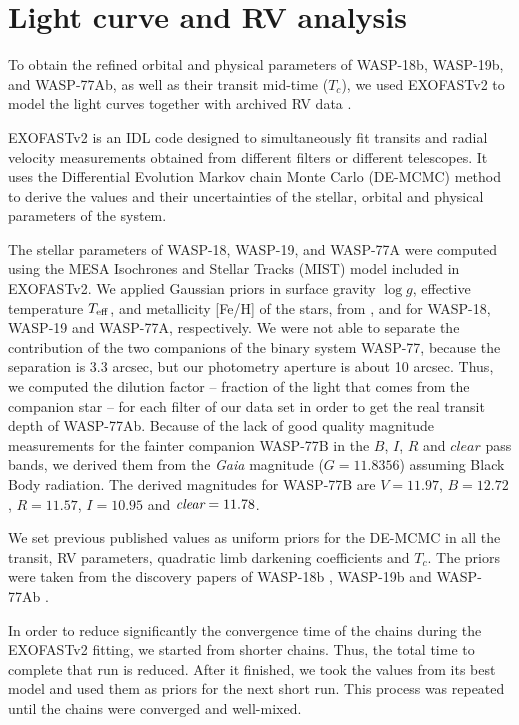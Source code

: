 \section{Light curve and RV analysis}\label{lc}

To obtain the refined orbital and physical parameters of WASP-18b, WASP-19b, and WASP-77Ab, as well as their transit mid-time ($T_{c}$), we used EXOFASTv2 \citep{Eastman2013,Eastman2017} to model the light curves together with archived RV data \cite{Hellier2009, Hebb2010, Maxted2013}.

EXOFASTv2 is an IDL code designed to simultaneously fit transits and radial velocity measurements obtained from different filters or different telescopes. It uses the Differential Evolution Markov chain Monte Carlo (DE-MCMC) method to derive the values and their uncertainties of the stellar, orbital and physical parameters of the system. 

The stellar parameters of WASP-18, WASP-19, and WASP-77A were computed using the MESA Isochrones and Stellar Tracks (MIST) model \citep{Dotter2016} included in EXOFASTv2. We applied Gaussian priors in surface gravity $\log{g}$, effective temperature $T_{\rm eff}$, and metallicity [Fe/H] of the stars, from \cite{Hellier2009},\cite{Hebb2010} and \cite{Maxted2013} for WASP-18, WASP-19 and WASP-77A, respectively. 
We were not able to separate the contribution of the two companions of the binary system WASP-77, because the separation is 3.3 arcsec, but our photometry aperture is about 10 arcsec. Thus, we computed the dilution factor -- fraction of the light that comes from the companion star -- for each filter of our data set in order to get the real transit depth of WASP-77Ab. Because of the lack of good quality magnitude measurements for the fainter companion WASP-77B in the $B$, $I$, $R$ and $clear$ pass bands, we derived them from the \emph{Gaia} magnitude ($G=11.8356$) assuming Black Body radiation. The derived magnitudes for WASP-77B are $V=11.97$, $B=12.72$, $R=11.57$, $I=10.95$ and $\emph{clear}=11.78$.

We set previous published values as uniform priors for the DE-MCMC in all the transit, RV parameters, quadratic limb darkening coefficients and $T_{c}$. The priors were taken from the discovery papers of WASP-18b \citep{Hellier2009}, WASP-19b \citep{Hebb2010} and WASP-77Ab \citep{Maxted2013}. 

In order to reduce significantly the convergence time of the chains during the EXOFASTv2 fitting, we started from shorter chains. Thus, the total time to complete that run is reduced. After it finished, we took the values from its best model and used them as priors for the next short run. This process was repeated until the chains were converged and well-mixed.

